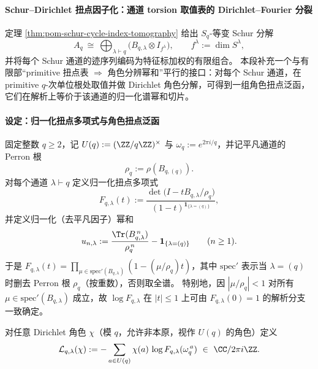 
\paragraph{Schur--Dirichlet 扭点因子化：通道 torsion 取值表的 Dirichlet--Fourier 分裂}
定理 \ref{thm:pom-schur-cycle-index-tomography} 给出 \(S_q\)-等变 Schur 分解
\[
A_q\ \cong\ \bigoplus_{\lambda\vdash q}\bigl(B_{q,\lambda}\otimes I_{f^\lambda}\bigr),
\qquad f^\lambda:=\dim S^\lambda,
\]
并将每个 Schur 通道的迹序列编码为特征标加权的有限组合。
本段补充一个与有限部“primitive 扭点表 \(\Rightarrow\) 角色分辨幂和”平行的接口：对每个 Schur 通道，在 primitive \(q\)-次单位根处取值并做 Dirichlet 角色分解，可得到一组角色扭点泛函，它们在解析上等价于该通道的归一化谱幂和切片。

\paragraph{设定：归一化扭点多项式与角色扭点泛函}
固定整数 \(q\ge2\)，记 \(U(q):=(\ZZ/q\ZZ)^\times\) 与 \(\omega_q:=e^{2\pi i/q}\)，并记平凡通道的 Perron 根
\[
\rho_q:=\rho(B_{q,(q)}).
\]
对每个通道 \(\lambda\vdash q\) 定义归一化扭点多项式
\[
F_{q,\lambda}(t)
:=
\frac{\det\!\bigl(I-tB_{q,\lambda}/\rho_q\bigr)}
{(1-t)^{\mathbf 1_{\{\lambda=(q)\}}}},
\]
并定义归一化（去平凡因子）幂和
\[
u_{n,\lambda}
:=
\frac{\Tr(B_{q,\lambda}^{\,n})}{\rho_q^{\,n}}
-\mathbf 1_{\{\lambda=(q)\}}
\qquad(n\ge1).
\]
于是 \(F_{q,\lambda}(t)=\prod_{\mu\in\mathrm{spec}'(B_{q,\lambda})}(1-(\mu/\rho_q)t)\)，其中 \(\mathrm{spec}'\) 表示当 \(\lambda=(q)\) 时删去 Perron 根 \(\rho_q\)（按重数），否则取全谱。
特别地，因 \(|\mu/\rho_q|<1\) 对所有 \(\mu\in\mathrm{spec}'(B_{q,\lambda})\) 成立，故 \(\log F_{q,\lambda}\) 在 \(|t|\le1\) 上可由 \(F_{q,\lambda}(0)=1\) 的解析分支一致确定。

\begin{definition}\label{def:pom-schur-dirichlet-torsion-functional}
对任意 Dirichlet 角色 \(\chi\)（模 \(q\)，允许非本原，视作 \(U(q)\) 的角色）定义
\[
\mathcal{L}_{q,\lambda}(\chi)
:=
-\sum_{a\in U(q)}\chi(a)\,\log F_{q,\lambda}(\omega_q^{\,a})
\ \in\ \CC/2\pi i\ZZ.
\]
\end{definition}

